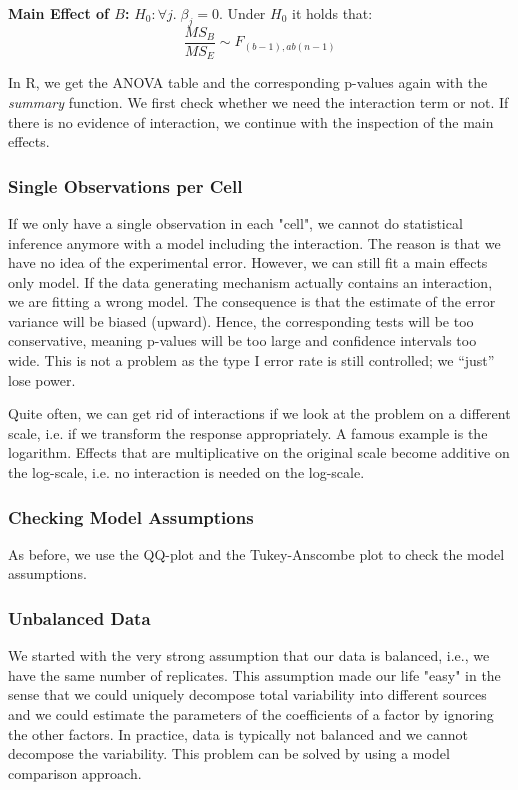 \textbf{Main Effect of $B$:} $H_0: \forall j. \; \beta_j = 0$. Under $H_0$ it holds that:
$$\frac{MS_{B}}{MS_E} \sim F_{(b-1), ab(n-1)}$$

In R, we get the ANOVA table and the corresponding p-values again with the \textit{summary} function. We first check whether we need the interaction term or not. If there is no evidence of interaction, we continue with the inspection of the main effects.

\subsubsection{Single Observations per Cell}

If we only have a single observation in each "cell", we cannot do statistical inference anymore with a model including the interaction. The reason is that we have no idea of the experimental error. However, we can still fit a main effects only model. If the data generating mechanism actually contains an interaction, we are fitting a wrong model. The consequence is that the estimate of the error variance will be biased (upward). Hence, the corresponding tests will be too conservative, meaning p-values will be too large and confidence intervals too wide. This is not a problem as the type I error rate is still controlled; we “just” lose power. \medskip

Quite often, we can get rid of interactions if we look at the problem on a different scale, i.e. if we transform the response appropriately. A famous example is the logarithm. Effects that are multiplicative on the original scale become additive on the log-scale, i.e. no interaction is needed on the log-scale.

\subsubsection{Checking Model Assumptions}

As before, we use the QQ-plot and the Tukey-Anscombe plot to check the model assumptions.

\subsubsection{Unbalanced Data}

We started with the very strong assumption that our data is balanced, i.e., we have the same number of replicates. This assumption made our life "easy" in the sense that we could uniquely decompose total variability into different sources and we could estimate the parameters of the coefficients of a factor by ignoring the other factors. In practice, data is typically not balanced and we cannot decompose the variability. This problem can be solved by using a model comparison approach. \medskip

